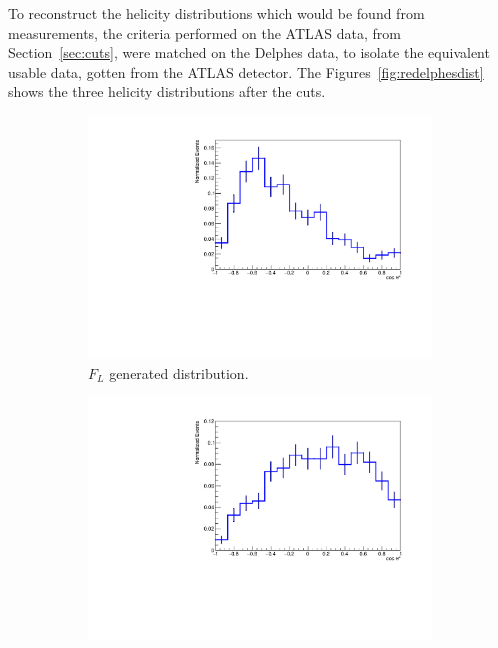 \documentclass[12pt,a4paper]{article}
\numberwithin{equation}{section}
\begin{document}
To reconstruct the helicity distributions which would be found from
measurements, the criteria performed on the ATLAS data, from
Section~\ref{sec:cuts}, were matched on the Delphes data, to isolate the
equivalent usable data, gotten from the ATLAS detector. The
Figures~\ref{fig:redelphesdist} shows the three helicity distributions after the
cuts.
\begin{figure}[t!]
  \centering
  \begin{subfigure}[t]{0.5\textwidth}
    \centering
    \includegraphics[width=1.0\textwidth]{figures/delphes_ctstarL}
    \caption{$F_L$ generated distribution.}
  \end{subfigure}%
  \begin{subfigure}[t]{0.5\textwidth}
    \centering
    \includegraphics[width=1.0\textwidth]{figures/delphes_ctstarR}

\end{subfigure}
\end{figure}
\end{document}
